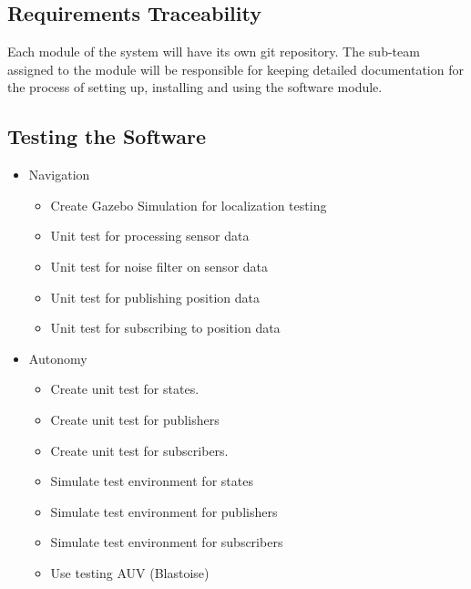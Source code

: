 \subsection{Requirements Traceability}
\label{sec:traceability}

Each module of the system will have its own git repository. The sub-team
assigned to the module will be responsible for keeping detailed documentation
for the process of setting up, installing and using the software module.
\par

\subsection{Testing the Software}
\label{sec:testing}

\begin{itemize}
    \item Navigation 
        \begin{itemize}
            \item Create Gazebo Simulation for localization testing 
            \item Unit test for processing sensor data 
            \item Unit test for noise filter on sensor data 
            \item Unit test for publishing position data 
            \item Unit test for subscribing to position data 
        \end{itemize}

    \item Autonomy 
        \begin{itemize}
            \item Create unit test for states.  
            \item Create unit test for publishers 
            \item Create unit test for subscribers. 
            \item Simulate test environment for states 
            \item Simulate test environment for publishers 
            \item Simulate test environment for subscribers 
            \item Use testing AUV (Blastoise)
        \end{itemize}
\end{itemize}

